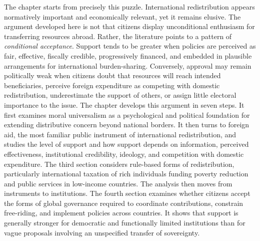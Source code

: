 \documentclass[11pt,a4paper]{article}
\begin{document}
The chapter starts from precisely this puzzle. International redistribution appears normatively important and economically relevant, yet 
it remains elusive. %
The argument developed here is not that citizens display unconditional enthusiasm for transferring resources abroad. %
Rather, the literature points to a pattern of \emph{conditional acceptance}. Support tends to be greater when policies are perceived as fair, effective, fiscally credible, progressively financed, and embedded in plausible arrangements for international burden-sharing. Conversely, approval may remain politically weak when citizens doubt that resources will reach intended beneficiaries, 
perceive foreign expenditure as competing with domestic redistribution, %
underestimate the support of others, %
or assign little electoral importance to the issue. %
The chapter develops %
this argument in seven steps. It first examines moral universalism as a psychological and political foundation for extending distributive concern beyond national borders. It then turns to foreign aid, the most familiar public instrument of international redistribution, and studies 
the level of support and %
how support depends on information, perceived effectiveness, institutional credibility, ideology, and competition with domestic expenditure. The third section considers %
rule-based forms of redistribution, particularly international taxation of 
rich %
individuals funding %
poverty reduction and public services in low-income countries.
The analysis then moves from instruments to institutions. The fourth section examines whether citizens accept the forms of global governance required to coordinate contributions, constrain free-riding, and implement policies across countries. 
It shows that support is generally stronger for democratic and functionally limited institutions than for vague proposals involving an unspecified transfer of sovereignty. %
\end{document}
